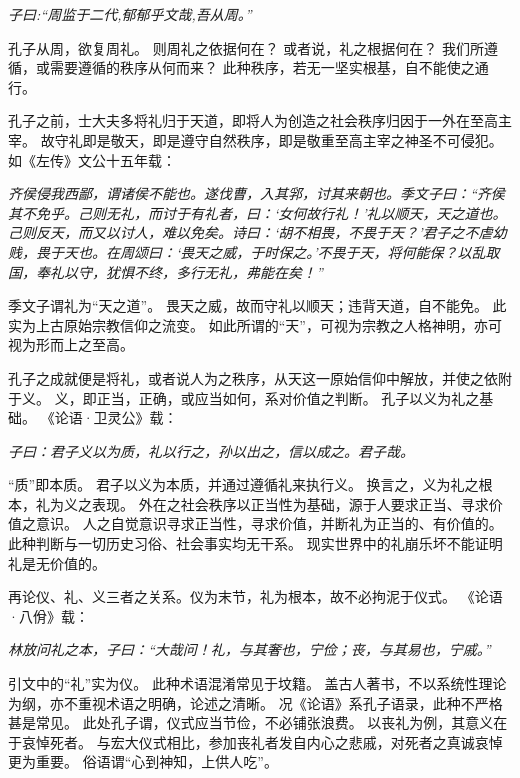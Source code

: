 \documentclass[11pt]{article}
\begin{document}
\textit{子曰:“周监于二代,郁郁乎文哉,吾从周。”}

孔子从周，欲复周礼。
则周礼之依据何在？
或者说，礼之根据何在？
我们所遵循，或需要遵循的秩序从何而来？
此种秩序，若无一坚实根基，自不能使之通行。

\par

孔子之前，士大夫多将礼归于天道，即将人为创造之社会秩序归因于一外在至高主宰。
故守礼即是敬天，即是遵守自然秩序，即是敬重至高主宰之神圣不可侵犯。
如《左传》文公十五年载：

\textit{齐侯侵我西鄙，谓诸侯不能也。遂伐曹，入其郛，讨其来朝也。季文子曰：“齐侯其不免乎。己则无礼，而讨于有礼者，曰：‘女何故行礼！’礼以顺天，天之道也。己则反天，而又以讨人，难以免矣。诗曰：‘胡不相畏，不畏于天？’君子之不虐幼贱，畏于天也。在周颂曰：‘畏天之威，于时保之。’不畏于天，将何能保？以乱取国，奉礼以守，犹惧不终，多行无礼，弗能在矣！”}

季文子谓礼为“天之道”。
畏天之威，故而守礼以顺天；违背天道，自不能免。
此实为上古原始宗教信仰之流变。
如此所谓的“天”，可视为宗教之人格神明，亦可视为形而上之至高。

\par

孔子之成就便是将礼，或者说人为之秩序，从天这一原始信仰中解放，并使之依附于义。
义，即正当，正确，或应当如何，系对价值之判断。
孔子以义为礼之基础。
《论语·卫灵公》载：

\textit{子曰：君子义以为质，礼以行之，孙以出之，信以成之。君子哉。}

“质”即本质。
君子以义为本质，并通过遵循礼来执行义。
换言之，义为礼之根本，礼为义之表现。
外在之社会秩序以正当性为基础，源于人要求正当、寻求价值之意识。
人之自觉意识寻求正当性，寻求价值，并断礼为正当的、有价值的。
此种判断与一切历史习俗、社会事实均无干系。
现实世界中的礼崩乐坏不能证明礼是无价值的。

\par

再论仪、礼、义三者之关系。仪为末节，礼为根本，故不必拘泥于仪式。
《论语·八佾》载：

\textit{林放问礼之本，子曰：“大哉问！礼，与其奢也，宁俭；丧，与其易也，宁戚。”}

引文中的“礼”实为仪。
此种术语混淆常见于坟籍。
盖古人著书，不以系统性理论为纲，亦不重视术语之明确，论述之清晰。
况《论语》系孔子语录，此种不严格甚是常见。
此处孔子谓，仪式应当节俭，不必铺张浪费。
以丧礼为例，其意义在于哀悼死者。
与宏大仪式相比，参加丧礼者发自内心之悲戚，对死者之真诚哀悼更为重要。
俗语谓“心到神知，上供人吃”。

\par
\end{document}
